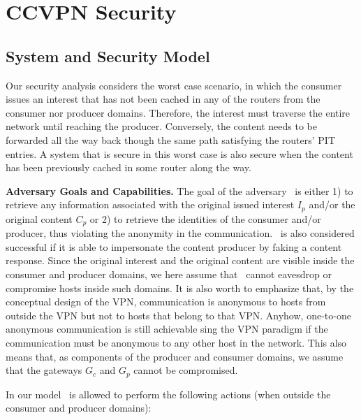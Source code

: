 \section{CCVPN Security}\label{sec:sec-analysis}


\subsection{System and Security Model} \label{sec:goals}

Our security analysis considers the worst case scenario, in which the consumer issues an
interest that has not been cached in any of the routers from the consumer nor producer domains.
Therefore, the interest must traverse the entire network until reaching the producer.
Conversely, the content needs to be forwarded all the way back though the same path
satisfying the routers' PIT entries. A system that is secure in this worst case is also
secure when the content has been previously cached in some router along the way.

\textbf{Adversary Goals and Capabilities.} The goal of the adversary \adv\ is either 1) to
retrieve any information associated with the original issued interest $I_p$ and/or the
original content $C_p$ or 2) to retrieve the identities of the consumer and/or producer,
thus violating the anonymity in the communication. \adv\ is also considered successful
if it is able to impersonate the content producer by faking a content response. Since the
original interest and the original content are visible inside the consumer and producer
domains, we here assume that \adv\ cannot eavesdrop or compromise hosts inside
such domains. It is also worth to emphasize that, by the conceptual design of the VPN,
communication is anonymous to hosts from outside the VPN but not to hosts that belong to
that VPN. Anyhow, one-to-one anonymous communication is still achievable sing the VPN
paradigm if the communication must be anonymous to any other host in the network. This
also means that, as components of the producer and consumer domains, we assume that the
gateways $G_c$ and $G_p$ cannot be compromised.

In our model \adv\ is allowed to perform the following actions (when outside the consumer and producer domains):

